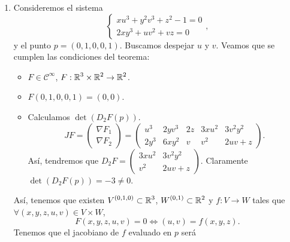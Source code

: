 \begin{eg}
\begin{enumerate}
En $\displaystyle p $, es fácil ver que la derivada segunda será 0. El resto de derivadas segundas se calculan de forma análoga. \\ 
Otra manera de calcular las derivadas es de forma implícita:
\[\frac{\partial }{\partial x}\left(z^{3}+x\left(z-y\right)\right) = 0 \Rightarrow 3z^{2}\frac{\partial f}{\partial x} + \left(z-y\right) + x \frac{\partial f}{\partial x} = 0 .\]
\[\frac{\partial }{\partial y}\left(z^{3}+x\left(z-y\right)\right)= 0 \Rightarrow 3z^{2}\frac{\partial f}{\partial y}+x\left(\frac{\partial f}{\partial y }-1\right)= 0 .\]
\item Consideremos el sistema 
	\[
	\begin{cases}
	xu^{3} +y^{2}v^{3} + z^{2} - 1 = 0 \\
	2xy^{3} + uv^{2} + vz = 0
	\end{cases}
	,\]
y el punto $\displaystyle p = \left(0,1,0,0,1\right) $. Buscamos despejar $\displaystyle u $ y $\displaystyle v $. Veamos que se cumplen las condiciones del teorema:
\begin{itemize}
\item $\displaystyle F \in \mathcal{C}^{\infty} $, $\displaystyle F : \mathbb{R}^{3}\times\mathbb{R}^{2} \to \mathbb{R}^{2} $. 
\item $\displaystyle F\left(0,1,0,0,1\right) = \left(0,0\right) $.
\item Calculamos $\displaystyle \det\left(D_{2}F\left(p\right)\right) $. 
	\[JF = \begin{pmatrix} \nabla F_{1} \\ \nabla F_{2} \end{pmatrix} = \begin{pmatrix} u^{3} & 2yv^{3} & 2z & 3xu^{2} & 3v^{2}y^{2} \\ 2y^{3} & 6xy^{2} & v & v^{2} & 2uv+z \end{pmatrix}.\]
	Así, tendremos que $\displaystyle D_{2}F = \begin{pmatrix} 3xu^{2} & 3v^{2}y^{2} \\ v^{2} & 2uv +z \end{pmatrix} $. Claramente $\displaystyle \det\left(D_{2}F\left(p\right)\right) = -3 \neq 0 $. 
\end{itemize}
Así, tenemos que existen $\displaystyle V^{\left(0,1,0\right)} \subset \mathbb{R}^{3} $, $\displaystyle W ^{\left(0,1\right)}\subset \mathbb{R}^{2} $ y $\displaystyle f : V \to W $ tales que $\displaystyle \forall \left(x,y,z,u,v\right) \in V \times W $,
\[F\left(x,y,z,u,v\right) = 0 \iff \left(u,v\right) = f\left(x,y,z\right) .\]
Tenemos que el jacobiano de $\displaystyle f $ evaluado en $\displaystyle p $ será

\end{enumerate}
\end{eg}
